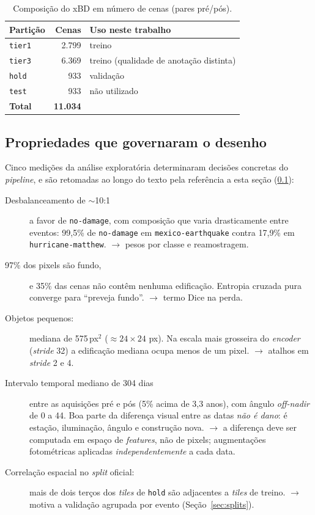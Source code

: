\documentclass[11pt,a4paper]{article}
\begin{document}
\begin{table}[htbp]
\centering
\caption{Composição do xBD em número de cenas (pares pré/pós).}
\label{tab:dados}
\begin{tabular}{lrl}
\toprule
\textbf{Partição} & \textbf{Cenas} & \textbf{Uso neste trabalho} \\
\midrule
\texttt{tier1} & 2.799 & treino \\
\texttt{tier3} & 6.369 & treino (qualidade de anotação distinta) \\
\texttt{hold}  & 933   & validação \\
\texttt{test}  & 933   & não utilizado \\
\midrule
\textbf{Total} & \textbf{11.034} & \\
\bottomrule
\end{tabular}
\end{table}

\subsection{Propriedades que governaram o desenho}
\label{sec:eda}

Cinco medições da análise exploratória determinaram decisões concretas do
\emph{pipeline}, e são retomadas ao longo do texto pela referência a esta
seção (\ref{sec:eda}):

\begin{description}
  \item[Desbalanceamento de $\sim$10:1] a favor de \texttt{no-damage}, com
  composição que varia drasticamente entre eventos: 99{,}5\% de
  \texttt{no-damage} em \texttt{mexico-earthquake} contra 17{,}9\% em
  \texttt{hurricane-matthew}. $\rightarrow$ pesos por classe e reamostragem.

  \item[97\% dos pixels são fundo,] e 35\% das cenas não contêm nenhuma
  edificação. Entropia cruzada pura converge para ``preveja fundo''.
  $\rightarrow$ termo Dice na perda.

  \item[Objetos pequenos:] mediana de 575\,px$^2$ ($\approx 24\times24$ px).
  Na escala mais grosseira do \emph{encoder} (\emph{stride} 32) a edificação
  mediana ocupa menos de um pixel. $\rightarrow$ atalhos em \emph{stride} 2 e 4.

  \item[Intervalo temporal mediano de 304 dias] entre as aquisições pré e pós
  (5\% acima de 3{,}3 anos), com ângulo \emph{off-nadir} de 0\textdegree{} a
  44\textdegree. Boa parte da diferença visual entre as datas \emph{não é dano}:
  é estação, iluminação, ângulo e construção nova. $\rightarrow$ a diferença
  deve ser computada em espaço de \emph{features}, não de pixels; augmentações
  fotométricas aplicadas \emph{independentemente} a cada data.

  \item[Correlação espacial no \emph{split} oficial:] mais de dois terços dos
  \emph{tiles} de \texttt{hold} são adjacentes a \emph{tiles} de treino.
  $\rightarrow$ motiva a validação agrupada por evento (Seção~\ref{sec:splits}).
\end{description}
\end{document}
